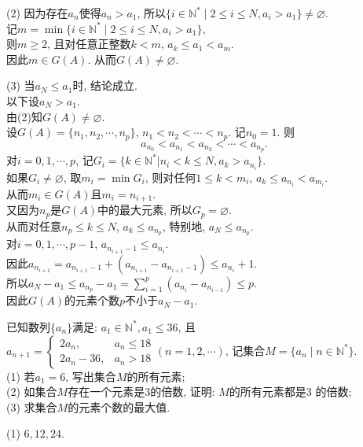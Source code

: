 \documentclass[green]{lsbook}
\begin{document}
(2) 因为存在$a_n$使得$a_n>a_1$, 所以$\{i\in \mathbb{N}^{*}\mid 2\leq i\leq N, a_i>a_1\}\neq \varnothing$. \\
记$m=\min \{i\in \mathbb{N}^{*}\mid 2\leq i\leq N, a_i>a_1\}$,\\  
则$m\geq 2$, 且对任意正整数$k<m$, $a_k\leq a_1<a_m$. \\
因此$m\in G(A)$. 从而$G(A)\neq \varnothing$. 

(3) 当$a_N\leq a_1$时, 结论成立.\\ 
以下设$a_N>a_1$. \\
由(2)知$G(A)\neq \varnothing$. \\
设$G(A)=\{n_1, n_2,\cdots,n_p\}$, $n_1<n_2<\cdots <n_p$. 记$n_0=1$.
则
\[a_{n_0}<a_{n_1}<a_{n_2}<\cdots <a_{n_p}.\] 
对$i=0, 1, \cdots, p$, 记$G_i=\{k\in \mathbb{N}^*|n_i<k\leq N, a_k>a_{n_i}\}$. \\
如果$G_i\neq \varnothing$, 取$m_i=\min G_i$, 则对任何$1\leq k<m_i$, $a_k\leq a_{n_i}<a_{m_i}$. \\
从而$m_i\in G(A)$且$m_i=n_{i+1}$.\\ 
又因为$n_p$是$G(A)$中的最大元素, 所以$G_p=\varnothing$. \\
从而对任意$n_p\leq k\leq N$, $a_k\leq a_{n_p}$, 特别地, $a_N\leq a_{n_p}$. \\
对$i=0, 1,\cdots, p-1$, $a_{n_{i+1}-1}\leq a_{n_i}$.\\ 
因此$a_{n_{i+1}}=a_{n_{i+1}-1}+(a_{n_{i+1}}-a_{n_{i+1}-1})\leq a_{n_i}+1$.\\ 
所以$a_N-a_1\leq a_{n_p}-a_1=\sum_{i=1}^{p}{(a_{n_i}-a_{n_{i-1}})}\leq p$.\\ 
因此$G(A)$的元素个数$p$不小于$a_N-a_1$. 
\newpage


\begin{tcolorbox}[applelight,title={2015.20(本小题13分)}]
已知数列$\{a_n\}$满足: $a_1\in \mathbb{N}^*, a_1\leq 36$, 且$a_{n+1}=\begin{cases}
	2a_n, & a_n\leq 18\\
	2a_n-36, & a_n>18
\end{cases}(n=1,2,\cdots)$, 记集合$M=\{a_n\mid n\in \mathbb{N}^*\}$.\\
 (1) 若$a_1=6$, 写出集合$M$的所有元素;\\
 (2) 如集合$M$存在一个元素是$3$的倍数, 证明: $M$的所有元素都是$3$ 的倍数;\\
 (3) 求集合$M$的元素个数的最大值.
\end{tcolorbox}


(1) $6, 12, 24$. 
\end{document}
